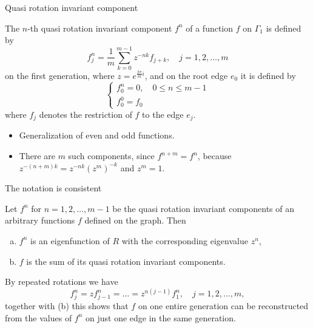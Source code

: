 \documentclass{beamer}
\begin{document}
  \begin{frame}{Quasi rotation invariant component}
    \begin{definition}
      The $n$-th quasi rotation invariant component $f^n$ of a function $f$ on $\Gamma_1$ is defined by
      \begin{equation*}
          f^n_j = \frac{1}{m} \sum_{k=0}^{m-1} z^{-nk} f_{j+k}, \quad j = 1, 2, \ldots, m
      \end{equation*}
      on the first generation, where $z=e^{\frac{2\pi}{m}i}$, and on the root edge $e_0$ it is defined by
      \[
        \begin{cases}
          f^n_0 = 0, \quad 0 \le n \le m-1 \\
          f^0_0 = f_0
        \end{cases}
      \]
      where $f_j$ denotes the restriction of $f$ to the edge $e_j$.
    \end{definition}
    \begin{itemize}
      \item Generalization of even and odd functions.
      \item There are $m$ such components, since $f^{n+m} = f^{n}$, because $z^{-(n+m)k} = z^{-nk}(z^m)^{-k}$ and $z^m=1$.
    \end{itemize}
  \end{frame}

  \begin{frame}{The notation is consistent}
    \begin{theorem}
      Let $f^n$ for $n = 1, 2, \ldots, m-1$ be the quasi rotation invariant components of an arbitrary functions $f$ defined on the graph. Then
      \begin{enumerate}[(a)]
        \item $f^n$ is an eigenfunction of $R$ with the corresponding eigenvalue $z^n$, %
        \item $f$ is the sum of its quasi rotation invariant components.%
      \end{enumerate}
    \end{theorem}
    \pause
    \begin{corollary}
      By repeated rotations we have
      \[
        f^n_j = z f^n_{j-1} = \ldots = z^{n(j-1)} f^n_1, \quad j = 1, 2, \ldots, m,
      \]
      together with {\normalfont(b)} this shows that $f$ on one entire generation can be reconstructed from the values of $f^n$ on just one edge in the same generation.
    \end{corollary}
  \end{frame}
\end{document}
